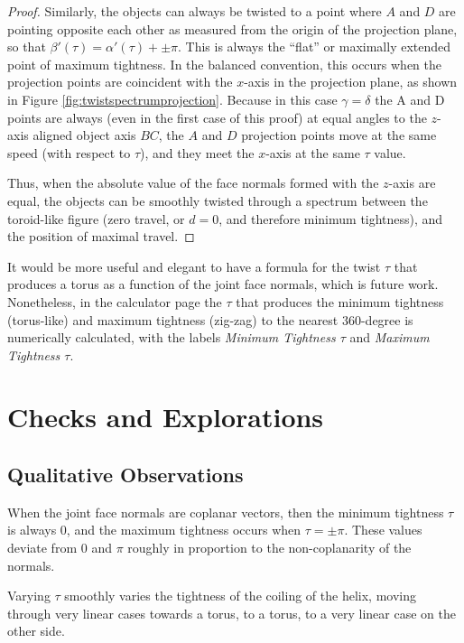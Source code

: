 \documentclass[11pt]{article}
\begin{document}
{\begin{proof}
    Similarly, the objects can always be twisted to a point where $A$ and $D$ are pointing opposite each other
    as measured from the origin of the projection plane, so that
    $\beta'(\tau) = \alpha'(\tau) + \pm \pi$.
    This is always the ``flat'' or maximally
    extended point of maximum tightness.
    In the balanced convention, this occurs when the projection points are
    coincident with the $x$-axis in the projection plane, as shown in Figure \ref{fig:twistspectrumprojection}.
    Because in this case $\gamma = \delta$ the A and D points are always (even in the first case of this proof)
    at equal angles to the $z$-axis aligned object axis $BC$, the $A$ and $D$ projection points move
    at the same speed (with respect to $\tau$), and they meet the $x$-axis at the same $\tau$ value.

    Thus, when the absolute value of the face normals formed with the $z$-axis are equal,
    the objects can be smoothly twisted through a spectrum between the toroid-like
    figure (zero travel, or $d = 0$, and therefore minimum tightness), and the position of maximal travel.

\end{proof}


It would be more useful and elegant to have a formula for the twist $\tau$ that produces
a torus as a function of the joint face normals, which is future work.
Nonetheless, in the calculator page
the $\tau$ that produces the minimum tightness (torus-like) and maximum tightness (zig-zag) to the
nearest 360-degree is numerically calculated,
with the labels {\em Minimum Tightness $\tau$} and {\em Maximum Tightness $\tau$}.

\section{Checks and Explorations}

\subsection{Qualitative Observations}

When the joint face normals are coplanar vectors, then the minimum tightness $\tau$ is
always $0$, and the maximum tightness occurs when $\tau = \pm \pi$.
These values deviate from $0$ and $\pi$ roughly in proportion
to the non-coplanarity of the normals.

Varying $\tau$ smoothly varies the tightness of the coiling of the helix,
moving through very linear cases towards a torus,
to a torus, to a very linear case on the other side.

}
\end{document}
